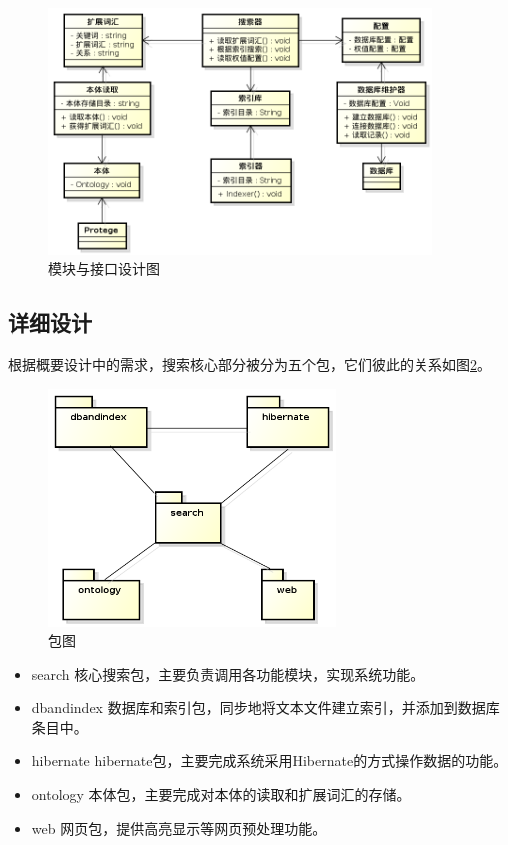 \documentclass[12pt,a4paper]{article}
\begin{document}
	\begin{figure}[htbp] 
	\centering\includegraphics[width=4in]{fig/moduleInterface.png} 
	\caption{模块与接口设计图}\label{fig:模块与接口设计图}
	\end{figure}
	
	\subsection{详细设计}	
	根据概要设计中的需求，搜索核心部分被分为五个包，它们彼此的关系如图\ref{fig:包图}。
	\begin{figure}[htbp] 
	\centering\includegraphics[width=3in]{fig/Package.png} 
	\caption{包图}\label{fig:包图}
	\end{figure}
	
	\begin{itemize}
	\item search
	核心搜索包，主要负责调用各功能模块，实现系统功能。
	\item dbandindex
	数据库和索引包，同步地将文本文件建立索引，并添加到数据库条目中。
	\item hibernate
	hibernate包，主要完成系统采用Hibernate的方式操作数据的功能。
	\item ontology
	本体包，主要完成对本体的读取和扩展词汇的存储。
	\item web
	网页包，提供高亮显示等网页预处理功能。	
	\end{itemize}
	
\end{document}
